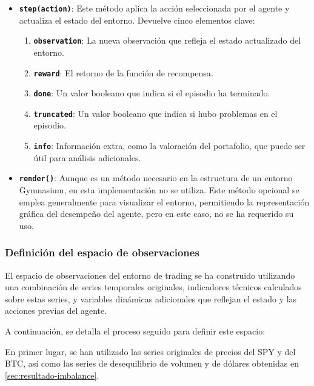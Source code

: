 \documentclass[a4paper,12pt, twoside]{report}
\begin{document}
\begin{itemize}
\begin{itemize}
        \item \textbf{\texttt{step(action)}}: Este método aplica la acción seleccionada por el agente y actualiza el estado del entorno. Devuelve cinco elementos clave:
        \begin{enumerate}
            \item \textbf{\texttt{observation}}: La nueva observación que refleja el estado actualizado del entorno.
            \item \textbf{\texttt{reward}}: El retorno de la función de recompensa.
            \item \textbf{\texttt{done}}: Un valor booleano que indica si el episodio ha terminado.
            \item \textbf{\texttt{truncated}}: Un valor booleano que indica si hubo problemas en el episodio.
            \item \textbf{\texttt{info}}: Información extra, como la valoración del portafolio, que puede ser útil para análisis adicionales.
        \end{enumerate}

        \item \textbf{\texttt{render()}}: Aunque es un método necesario en la estructura de un entorno Gymnasium, en esta implementación no se utiliza. Este método opcional se emplea generalmente para visualizar el entorno, permitiendo la representación gráfica del desempeño del agente, pero en este caso, no se ha requerido su uso.
    \end{itemize}
\end{itemize}

\subsubsection{Definición del espacio de observaciones}
\label{sec:espacio_observaciones}

El espacio de observaciones del entorno de trading se ha construido utilizando una 
combinación de series temporales originales, indicadores técnicos calculados sobre 
estas series, y variables dinámicas adicionales que reflejan el estado y las acciones 
previas del agente. 

A continuación, se detalla el proceso seguido para definir este espacio:

En primer lugar, se han utilizado las series originales de precios del SPY y del BTC, 
así como las series de desequilibrio de volumen y de dólares obtenidas en \ref{sec:resultado-imbalance}.
\end{document}
